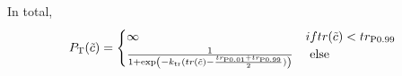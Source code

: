 In total, 
\begin{equation}
P_{\rm T}(\tilde{c}) = 
\begin{cases} \infty & { if }tr(\tilde{c})< tr_{\rm P0.99} \\
\frac{1}{1+\exp\left( - k_{\rm tr} (tr(\tilde{c})-\frac{tr_{\rm P0.01}+tr_{\rm P0.99}}{2}) \right)} & \text{ else }
\end{cases}
\end{equation}







